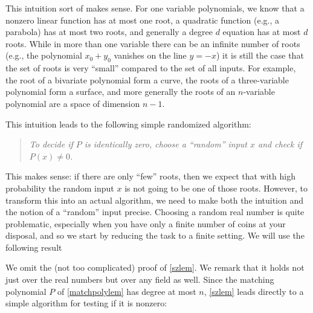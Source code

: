 This intuition sort of makes sense. For one variable polynomials, we
know that a nonzero linear function has at most one root, a quadratic
function (e.g., a parabola) has at most two roots, and generally a
degree \(d\) equation has at most \(d\) roots. While in more than one
variable there can be an infinite number of roots (e.g., the polynomial
\(x_0+y_0\) vanishes on the line \(y=-x\)) it is still the case that the
set of roots is very ``small'' compared to the set of all inputs. For
example, the root of a bivariate polynomial form a curve, the roots of a
three-variable polynomial form a surface, and more generally the roots
of an \(n\)-variable polynomial are a space of dimension \(n-1\).

This intuition leads to the following simple randomized algorithm:

\begin{quote}
\emph{To decide if \(P\) is identically zero, choose a ``random'' input
\(x\) and check if \(P(x)\neq 0\).}
\end{quote}

This makes sense: if there are only ``few'' roots, then we expect that
with high probability the random input \(x\) is not going to be one of
those roots. However, to transform this into an actual algorithm, we
need to make both the intuition and the notion of a ``random'' input
precise. Choosing a random real number is quite problematic, especially
when you have only a finite number of coins at your disposal, and so we
start by reducing the task to a finite setting. We will use the
following result

\hypertarget{szlem}{}

We omit the (not too complicated) proof of \cref{szlem}. We remark that
it holds not just over the real numbers but over any field as well.
Since the matching polynomial \(P\) of \cref{matchpolylem} has degree at
most \(n\), \cref{szlem} leads directly to a simple algorithm for
testing if it is nonzero:

